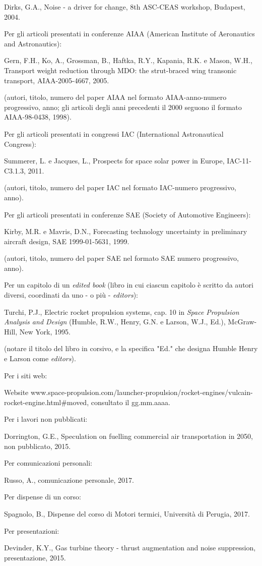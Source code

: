 \documentclass{baer}
\begin{document}
\begin{thebibliography}{99}
 Dirks, G.A., Noise - a driver for change, 8th ASC-CEAS workshop, Budapest, 2004.

Per gli articoli presentati in conferenze AIAA (American Institute of Aeronautics and Astronautics):

 Gern, F.H., Ko, A., Grossman, B., Haftka, R.Y., Kapania, R.K. e Mason, W.H., Transport weight reduction through MDO: the strut-braced wing transonic transport, AIAA-2005-4667, 2005.

(autori, titolo, numero del paper AIAA nel formato AIAA-anno-numero progressivo, anno; gli articoli degli anni precedenti il 2000 seguono il formato AIAA-98-0438, 1998).

Per gli articoli presentati in congressi IAC (International Astronautical Congress):

 Summerer, L. e Jacques, L., Prospects for space solar power in Europe, IAC-11-C3.1.3, 2011.

(autori, titolo, numero del paper IAC nel formato IAC-numero progressivo, anno).

Per gli articoli presentati in conferenze SAE (Society of Automotive Engineers):

 Kirby, M.R. e Mavris, D.N., Forecasting technology uncertainty in preliminary aircraft design, SAE 1999-01-5631, 1999.

(autori, titolo, numero del paper SAE nel formato SAE numero progressivo, anno).

Per un capitolo di un \textit{edited book} (libro in cui ciascun capitolo è scritto da autori diversi, coordinati da uno - o più - \textit{editors}):

 Turchi, P.J., Electric rocket propulsion systems, cap. 10 in \textit{Space Propulsion Analysis and Design} (Humble, R.W., Henry, G.N. e Larson, W.J., Ed.), McGraw-Hill, New York, 1995.

(notare il titolo del libro in corsivo, e la specifica "Ed." che designa Humble Henry e Larson come \textit{editors}).

Per i siti web:

 Website www.space-propulsion.com/launcher-propulsion/rocket-engines/vulcain-rocket-engine.html\#moved, consultato il gg.mm.aaaa.

Per i lavori non pubblicati:

 Dorrington, G.E., Speculation on fuelling commercial air transportation in 2050, non pubblicato, 2015.

Per comunicazioni personali:

 Russo, A., comunicazione personale, 2017.

Per dispense di un corso:

 Spagnolo, B., Dispense del corso di Motori termici, Università di Perugia, 2017.

Per presentazioni:

 Devinder, K.Y., Gas turbine theory - thrust augmentation and noise suppression, presentazione, 2015.

\end{thebibliography}
\end{document}
